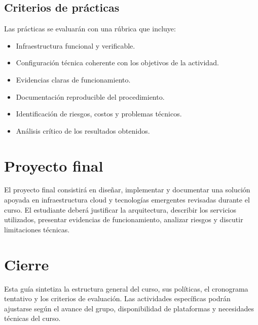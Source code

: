 \documentclass[
  coursetitle={Cómputo Nube y Tecnologías Emergentes},
  coursehours={96},
  coursedate={Verano 2026},
  doctype={Guía del curso},
  otherlangs={english,french},
  authorname={Lázaro},
  authorsurname={Bustio-Martínez},
  authortitle={PhD},
  role={Profesor Investigador},
  email={lbustio@inaoe.mx},
  phone={5559504000},
  ext={7459},
  institution={Instituto Nacional de Astrofísica, Óptica y Electrónica (INAOE)},
  department={Maestría en Ciencias en Tecnologías de Seguridad},
  address={Luis Enrique Erro 1, Sta. Ma. Tonantzintla, San Andrés Cholula, CP 72840, Puebla, México},
  margin={0.5in}
]{lbustio_lecture_notes}
\begin{document}
\subsection{Criterios de prácticas}
Las prácticas se evaluarán con una rúbrica que incluye:
\begin{itemize}
  \item Infraestructura funcional y verificable.
  \item Configuración técnica coherente con los objetivos de la actividad.
  \item Evidencias claras de funcionamiento.
  \item Documentación reproducible del procedimiento.
  \item Identificación de riesgos, costos y problemas técnicos.
  \item Análisis crítico de los resultados obtenidos.
\end{itemize}

\section{Proyecto final}
El proyecto final consistirá en diseñar, implementar y documentar una solución apoyada en infraestructura cloud y tecnologías emergentes revisadas durante el curso. El estudiante deberá justificar la arquitectura, describir los servicios utilizados, presentar evidencias de funcionamiento, analizar riesgos y discutir limitaciones técnicas.

\section{Cierre}
Esta guía sintetiza la estructura general del curso, sus políticas, el cronograma tentativo y los criterios de evaluación. Las actividades específicas podrán ajustarse según el avance del grupo, disponibilidad de plataformas y necesidades técnicas del curso.
\end{document}
